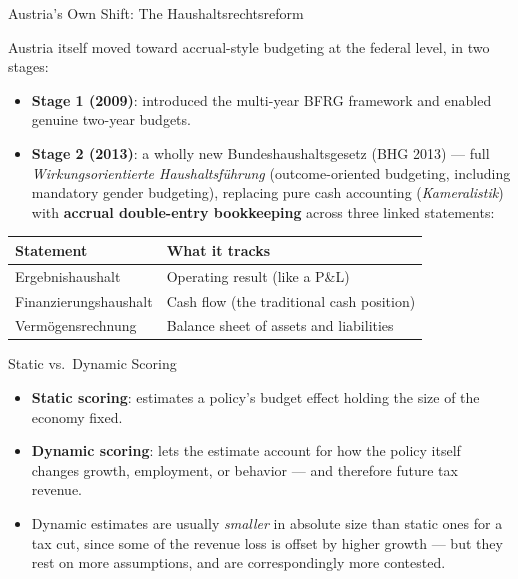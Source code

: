 \documentclass[11pt,aspectratio=169]{beamer}
\begin{document}
\begin{frame}{Austria's Own Shift: The Haushaltsrechtsreform}
 
  Austria itself moved toward accrual-style budgeting at the federal level, in two stages:
  \begin{itemize}
    \item \textbf{Stage 1 (2009)}: introduced the multi-year BFRG framework and enabled genuine two-year budgets.
    \item \textbf{Stage 2 (2013)}: a wholly new Bundeshaushaltsgesetz (BHG 2013) --- full \emph{Wirkungsorientierte Haushaltsführung} (outcome-oriented budgeting, including mandatory gender budgeting), replacing pure cash accounting (\emph{Kameralistik}) with \textbf{accrual double-entry bookkeeping} across three linked statements:
  \end{itemize}
  \vspace{0.2em}
  \begin{center}
  \begin{tabular}{@{}ll@{}}
    \toprule
    \textbf{Statement} & \textbf{What it tracks} \\
    \midrule
    Ergebnishaushalt & Operating result (like a P\&L) \\
    Finanzierungshaushalt & Cash flow (the traditional cash position) \\
    Vermögensrechnung & Balance sheet of assets and liabilities \\
    \bottomrule
  \end{tabular}
  \end{center}
 
\end{frame}

\begin{frame}{Static vs.\ Dynamic Scoring}
   
  \begin{itemize}
    \item \textbf{Static scoring}: estimates a policy's budget effect holding the size of the economy fixed.
    \item \textbf{Dynamic scoring}: lets the estimate account for how the policy itself changes growth, employment, or behavior --- and therefore future tax revenue.
    \item Dynamic estimates are usually \emph{smaller} in absolute size than static ones for a tax cut, since some of the revenue loss is offset by higher growth --- but they rest on more assumptions, and are correspondingly more contested.
  \end{itemize}
 
\end{frame}
\end{document}
